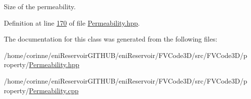 Size of the permeability. 



Definition at line \hyperlink{Permeability_8hpp_source_l00170}{170} of file \hyperlink{Permeability_8hpp_source}{Permeability.\+hpp}.



The documentation for this class was generated from the following files\+:\begin{DoxyCompactItemize}
\item 
/home/corinne/eni\+Reservoir\+G\+I\+T\+H\+U\+B/eni\+Reservoir/\+F\+V\+Code3\+D/src/\+F\+V\+Code3\+D/property/\hyperlink{Permeability_8hpp}{Permeability.\+hpp}\item 
/home/corinne/eni\+Reservoir\+G\+I\+T\+H\+U\+B/eni\+Reservoir/\+F\+V\+Code3\+D/src/\+F\+V\+Code3\+D/property/\hyperlink{Permeability_8cpp}{Permeability.\+cpp}\end{DoxyCompactItemize}
